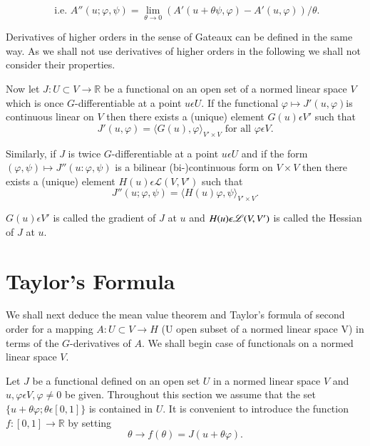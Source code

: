 $$
\text{ i.e. } A''(u; \varphi, \psi) = \lim_{\theta \to 0} (A'(u + \theta \psi, \varphi) - A'(u, \varphi))/ \theta.
$$

\begin{remark}\label{chap1-rem1.3}
Derivatives of higher orders in the sense of Gateaux can be defined in the same way. As we shall not use derivatives of higher orders in the following we shall not consider their properties.
\end{remark}

Now let $J : U \subset V \to \mathbb{R}$ be a functional on an open set of a normed linear space $V$ which is once $G$-differentiable at a point $u \epsilon U$. If the functional $\varphi \mapsto J'(u, \varphi)$\pageoriginale is continuous linear on $V$ then there exists a (unique) element $G(u) \epsilon V'$ such that
$$
J'(u, \varphi) = \langle G(u), \varphi \rangle_{V' \times V} \text{ for all } \varphi \epsilon V.
$$

Similarly, if $J$ is twice $G$-differentiable at a point $u \epsilon U$ and if the form $(\varphi, \psi) \mapsto J''(u : \varphi, \psi)$ is a bilinear (bi-)continuous form on $V \times V$ then there exists a (unique) element $H(u) \epsilon \mathscr{L} (V, V')$ such that
$$
J''(u; \varphi, \psi) = \langle H(u) \varphi, \psi \rangle_{V' \times V}.
$$

\begin{definition}\label{chap1-def1.3}
$G(u) \epsilon V'$ is called the gradient of $J$ at $u$ and $H(u)
  \epsilon \mathscr{L}\break (V, V')$ is called the Hessian of $J$ at $u$. 
\end{definition}

\section{Taylor's Formula}\label{chap1-sec2}
We shall next deduce the mean value theorem and Taylor's formula of second order for a mapping $A : U \subset V \to H$ (U open subset of a normed linear space V) in terms of the $G$-derivatives of $A$. We shall begin case of functionals on a normed linear space $V$.

Let $J$ be a functional defined on an open set $U$ in a normed linear space $V$ and $u, \varphi \epsilon V, \varphi \neq 0$ be given. Throughout this section we assume that the set $\{u + \theta \varphi ; \theta \epsilon [0, 1]\}$ is contained in $U$. It is convenient to introduce the function $f : [0, 1] \to \mathbb{R}$ by setting
$$
\theta \to f(\theta) = J(u + \theta \varphi).
$$

